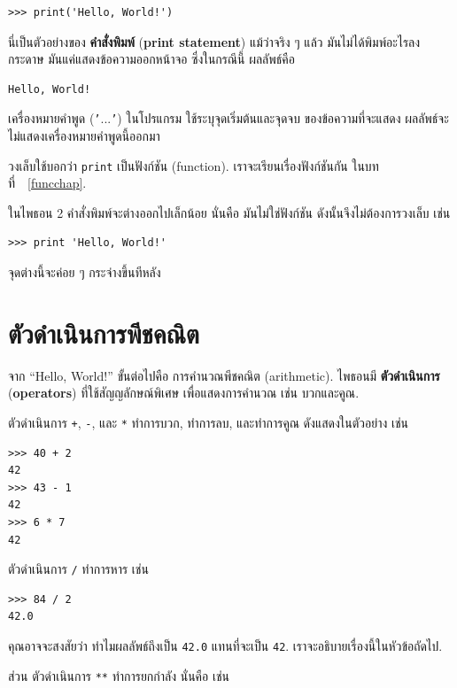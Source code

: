 \begin{verbatim}
>>> print('Hello, World!')
\end{verbatim}
%
นี่เป็นตัวอย่างของ \textbf{คำสั่งพิมพ์} (\textbf{print statement})
แม้ว่าจริง ๆ แล้ว มันไม่ได้พิมพ์อะไรลงกระดาษ
มันแค่แสดงข้อความออกหน้าจอ
ซึ่งในกรณีนี้ ผลลัพธ์คือ

\begin{verbatim}
Hello, World!
\end{verbatim}
%
เครื่องหมายคำพูด (\texttt{'}...\texttt{'}) 
ในโปรแกรม ใช้ระบุจุดเริ่มต้นและจุดจบ ของข้อความที่จะแสดง
ผลลัพธ์จะไม่แสดงเครื่องหมายคำพูดนี้ออกมา

วงเล็บใช้บอกว่า \texttt{print} เป็นฟังก์ชัน (function).  
เราจะเรียนเรื่องฟังก์ชันกัน ในบทที่~~\ref{funcchap}.
 

ในไพธอน 2 คำสั่งพิมพ์จะต่างออกไปเล็กน้อย 
นั่นคือ มันไม่ใช่ฟังก์ชัน ดังนั้นจึงไม่ต้องการวงเล็บ เช่น

\begin{verbatim}
>>> print 'Hello, World!'
\end{verbatim}
%
จุดต่างนี้จะค่อย ๆ กระจ่างขึ้นทีหลัง 

\section{ตัวดำเนินการพีชคณิต}

จาก ``Hello, World!'' ขั้นต่อไปคือ การคำนวณพีชคณิต (arithmetic).
ไพธอนมี \textbf{ตัวดำเนินการ} (\textbf{operators}) ที่ใช้สัญญลักษณ์พิเศษ เพื่อแสดงการคำนวณ เช่น บวกและคูณ.

ตัวดำเนินการ \texttt{+}, \texttt{-}, และ \texttt{*} 
ทำการบวก, ทำการลบ, และทำการคูณ ดังแสดงในตัวอย่าง เช่น

\begin{verbatim}
>>> 40 + 2
42
>>> 43 - 1
42
>>> 6 * 7
42
\end{verbatim}
%
ตัวดำเนินการ \texttt{/} ทำการหาร เช่น

\begin{verbatim}
>>> 84 / 2
42.0
\end{verbatim}
%
คุณอาจจะสงสัยว่า ทำไมผลลัพธ์ถึงเป็น \texttt{42.0} แทนที่จะเป็น \texttt{42}.
เราจะอธิบายเรื่องนี้ในหัวข้อถัดไป.

ส่วน ตัวดำเนินการ \texttt{**} ทำการยกกำลัง 
นั่นคือ เช่น

